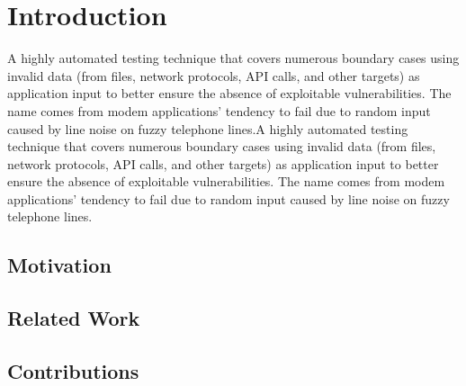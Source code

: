 \chapter{Introduction}
\minitoc
\vspace*{1cm}

A highly automated testing technique that covers numerous boundary cases
using invalid data (from files, network protocols, API calls, and other targets)
as application input to better ensure the absence of exploitable vulnerabilities.
The name comes from modem applications’ tendency to fail due
to random input caused by line noise on fuzzy telephone lines.A highly automated testing technique that covers numerous boundary cases
using invalid data (from files, network protocols, API calls, and other targets)
as application input to better ensure the absence of exploitable vulnerabilities.
The name comes from modem applications’ tendency to fail due
to random input caused by line noise on fuzzy telephone lines.


\section{Motivation}

\section{Related Work}

\section{Contributions}
